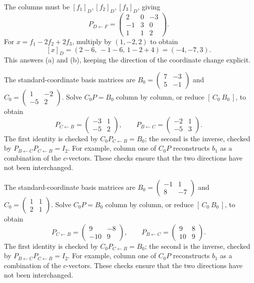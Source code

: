 The columns must be $[f_1]_D,[f_2]_D,[f_3]_D$, giving
\[
 P_{D\leftarrow F}=\begin{pmatrix}2&0&-3\\-1&3&0\\1&1&2\end{pmatrix}.
\]
For $x=f_1-2f_2+2f_3$, multiply by $(1,-2,2)$ to obtain
\[
 [x]_D=(2-6,\,-1-6,\,1-2+4)=(-4,-7,3).
\]
This answers (a) and (b), keeping the direction of the coordinate change explicit.

The standard-coordinate basis matrices are $B_0=\begin{pmatrix}7&-3\\5&-1\end{pmatrix}$ and $C_0=\begin{pmatrix}1&-2\\-5&2\end{pmatrix}$. Solve $C_0P=B_0$ column by column, or reduce $[\,C_0\ B_0\,]$, to obtain
\[ P_{C\leftarrow B}=\begin{pmatrix}-3&1\\-5&2\end{pmatrix},\qquad P_{B\leftarrow C}=\begin{pmatrix}-2&1\\-5&3\end{pmatrix}.\]
The first identity is checked by $C_0P_{C\leftarrow B}=B_0$; the second is the inverse, checked by $P_{B\leftarrow C}P_{C\leftarrow B}=I_2$. For example, column one of $C_0P$ reconstructs $b_1$ as a combination of the $c$-vectors. These checks ensure that the two directions have not been interchanged.

The standard-coordinate basis matrices are $B_0=\begin{pmatrix}-1&1\\8&-7\end{pmatrix}$ and $C_0=\begin{pmatrix}1&1\\2&1\end{pmatrix}$. Solve $C_0P=B_0$ column by column, or reduce $[\,C_0\ B_0\,]$, to obtain
\[ P_{C\leftarrow B}=\begin{pmatrix}9&-8\\-10&9\end{pmatrix},\qquad P_{B\leftarrow C}=\begin{pmatrix}9&8\\10&9\end{pmatrix}.\]
The first identity is checked by $C_0P_{C\leftarrow B}=B_0$; the second is the inverse, checked by $P_{B\leftarrow C}P_{C\leftarrow B}=I_2$. For example, column one of $C_0P$ reconstructs $b_1$ as a combination of the $c$-vectors. These checks ensure that the two directions have not been interchanged.

